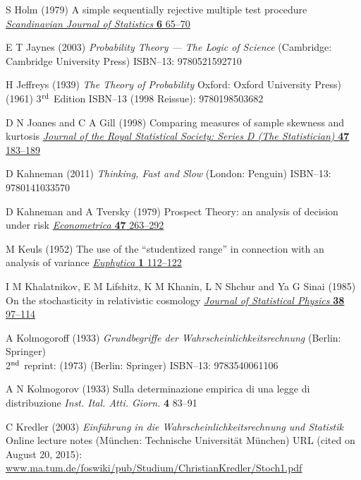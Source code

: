 \begin{thebibliography}{99}
S Holm
(1979) A simple sequentially rejective multiple test procedure
\href{http://www.jstor.org/stable/4615733}{\textit{Scandinavian 
Journal of Statistics} \textbf{6} 65--70}

E T Jaynes
(2003) \textit{Probability Theory --- The Logic of Science}
(Cambridge: Cambridge University Press) 
ISBN--13: 9780521592710

H Jeffreys
(1939) \textit{The Theory of Probability} 
Oxford: Oxford University Press)\\
(1961) 3$^{\rm rd}$ Edition
ISBN--13 (1998 Reissue): 9780198503682

D N Joanes and C A Gill
(1998) Comparing measures of sample skewness and kurtosis 
\href{http://dx.doi.org/10.1111/1467-9884.00122}{\textit{Journal of 
the Royal Statistical Society: Series D (The Statistician)} \textbf{
47} 183--189}

D Kahneman
(2011) \textit{Thinking, Fast and Slow} (London: Penguin)
ISBN--13: 9780141033570

D Kahneman and A Tversky
(1979) Prospect Theory: an analysis of decision under risk
\href{http://www.jstor.org/stable/1914185}{\textit{Econometrica} 
\textbf{47} 263--292}

M Keuls
(1952) The use of the ``studentized range'' in connection with an 
analysis of variance
\href{http://dx.doi.org/10.1007/BF01908269}{\textit{Euphytica} \textbf{
1} 112--122}

I M Khalatnikov, E M Lifshitz, K M Khanin, L N Shchur and Ya G 
Sinai (1985) On the stochasticity in relativistic cosmology
\href{http://dx.doi.org/10.1007/BF01017851}{\textit{Journal of 
Statistical Physics} \textbf{38} 97--114}

A Kolmogoroff
(1933) \textit{Grundbegriffe der Wahrscheinlichkeitsrechnung}
(Berlin: Springer)\\
2$^{\rm nd}$ reprint: (1973) (Berlin: Springer) ISBN--13: 
9783540061106

A N Kolmogorov
(1933) Sulla determinazione empirica di una legge di distribuzione
\textit{Inst. Ital. Atti. Giorn.} \textbf{4} 83--91

C Kredler
(2003) \textit{Einf\"{u}hrung in die 
Wahrscheinlichkeitsrechnung und Statistik} Online lecture notes 
(M\"{u}nchen: Technische Universit\"{a}t M\"{u}nchen)
URL (cited on August 20, 2015): 
\href{http://www.ma.tum.de/foswiki/pub/Studium/ChristianKredler/Stoch1.pdf}{www.ma.tum.de/foswiki/pub/Studium/ChristianKredler/Stoch1.pdf}


\end{thebibliography}
